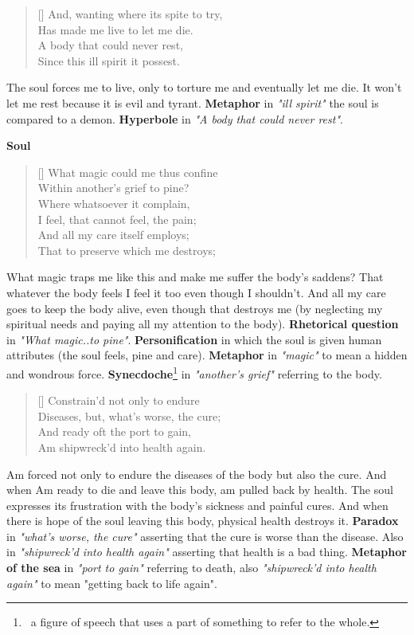 \documentclass[12pt, a4paper]{article}
\begin{document}
\begin{verse}[\versewidth]
{\fontverse
And, wanting where its spite to try,\\
Has made me live to let me die.\\
A body that could never rest,\\
Since this ill spirit it possest. 
} 
\end{verse}

The soul forces me to live, only to torture me and eventually let me die.
It won't let me rest because it is evil and tyrant. \textbf{Metaphor} in \textit{"ill spirit"} 
the soul is compared to a demon. \textbf{Hyperbole} in \textit{"A body that could never rest"}.
\bigbreak

\centerline{\textbf{\large{Soul}}}
\begin{verse}[\versewidth]
{\fontverse
What magic could me thus confine\\
Within another’s grief to pine?\\
Where whatsoever it complain,\\
I feel, that cannot feel, the pain;\\
And all my care itself employs;\\
That to preserve which me destroys;
} 
\end{verse}

What magic traps me like this and make me suffer the body's saddens? That
whatever the body feels I feel it too even though I shouldn't. And all my 
care goes to keep the body alive, even though that destroys me (by neglecting 
my spiritual needs and paying all my attention to the body). \textbf{Rhetorical question} in
\textit{"What magic..to pine"}. \textbf{Personification} in which the soul is given 
human attributes (the soul feels, pine and care). \textbf{Metaphor} in \textit{"magic"}
to mean a hidden and wondrous force. \textbf{Synecdoche}\footnote{\,
a figure of speech that uses a part of something to refer to the whole.} 
in \textit{"another's grief"} referring to the body.


\newpage
\begin{verse}[\versewidth]
{\fontverse
Constrain’d not only to endure\\
Diseases, but, what’s worse, the cure;\\
And ready oft the port to gain,\\
Am shipwreck’d into health again. 
} 
\end{verse}

Am forced not only to endure the diseases of the body but also the cure.
And when Am ready to die and leave this body, am pulled back by health.
The soul expresses its frustration with the body's sickness and painful cures.
And when there is hope of the soul leaving this body, physical health destroys it. 
\textbf{Paradox} in \textit{"what's worse, the cure"} asserting that the cure is worse
than the disease. Also in \textit{"shipwreck’d into health again"} asserting that health
is a bad thing. \textbf{Metaphor of the sea} in \textit{"port to gain"} referring to death,
also \textit{"shipwreck'd into health again"} to mean "getting back to life again".\bigbreak
\end{document}
